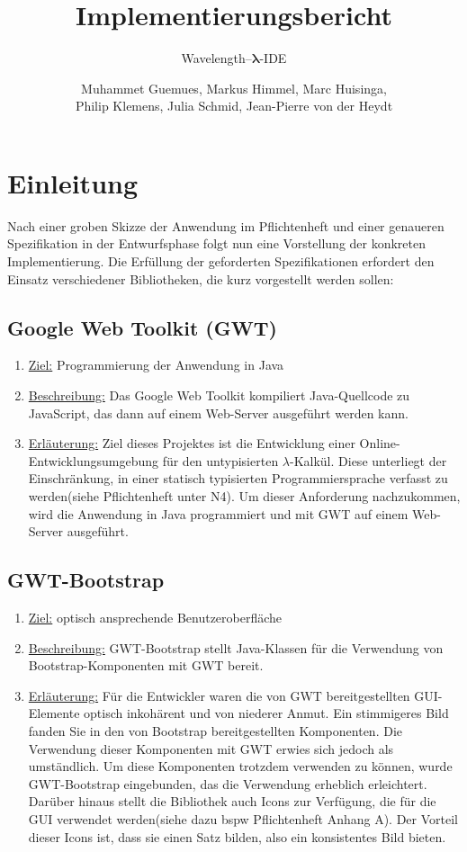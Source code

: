 \documentclass[parskip=full,11pt,twoside]{scrartcl}
\title{Implementierungsbericht}
\subtitle{Wavelength--$\bm{\lambda}$-IDE}
\author{Muhammet Guemues, Markus Himmel, Marc Huisinga,\\Philip Klemens, Julia Schmid, Jean-Pierre von der Heydt}
\begin{document}
\maketitle
\newpage
\tableofcontents
\newpage

\section{Einleitung}
Nach einer groben Skizze der Anwendung im Pflichtenheft und einer genaueren Spezifikation in der Entwurfsphase folgt nun eine Vorstellung der konkreten Implementierung.
Die Erfüllung der geforderten Spezifikationen erfordert den Einsatz verschiedener Bibliotheken, die kurz vorgestellt werden sollen:

\subsection{Google Web Toolkit (GWT)}
\begin{enumerate}
\item \underline{Ziel:} Programmierung der Anwendung in Java 
\item \underline{Beschreibung:} Das Google Web Toolkit kompiliert Java-Quellcode zu JavaScript, das dann auf einem Web-Server ausgeführt werden kann.
\item \underline{Erläuterung:} Ziel dieses Projektes ist die Entwicklung einer Online-Entwicklungsumgebung für den untypisierten $\lambda$-Kalkül.
Diese unterliegt der Einschränkung, in einer statisch typisierten Programmiersprache verfasst zu werden(siehe Pflichtenheft unter N4).
Um dieser Anforderung nachzukommen, wird die Anwendung in Java programmiert und mit GWT auf einem Web-Server ausgeführt.
\end{enumerate}

\subsection{GWT-Bootstrap}
\begin{enumerate}
\item \underline{Ziel:} optisch ansprechende Benutzeroberfläche 
\item \underline{Beschreibung:} GWT-Bootstrap stellt Java-Klassen für die Verwendung von Bootstrap-Komponenten mit GWT bereit.
\item \underline{Erläuterung:} Für die Entwickler waren die von GWT bereitgestellten GUI-Elemente optisch inkohärent und von niederer Anmut.
Ein stimmigeres Bild fanden Sie in den von Bootstrap bereitgestellten Komponenten.
Die Verwendung dieser Komponenten mit GWT erwies sich jedoch als umständlich.
Um diese Komponenten trotzdem verwenden zu können, wurde GWT-Bootstrap eingebunden, das die Verwendung erheblich erleichtert.
Darüber hinaus stellt die Bibliothek auch Icons zur Verfügung, die für die GUI verwendet werden(siehe dazu bspw Pflichtenheft Anhang A).
Der Vorteil dieser Icons ist, dass sie einen Satz bilden, also ein konsistentes Bild bieten.
\end{enumerate}
\end{document}
